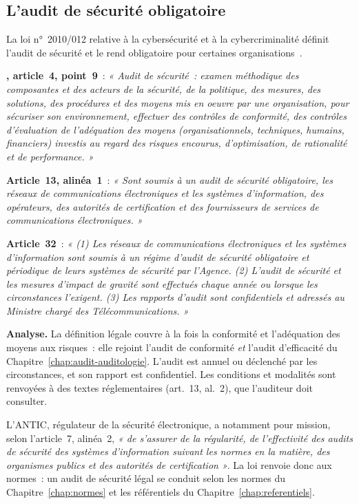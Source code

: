 \subsection{L'audit de sécurité obligatoire}

La loi n°~2010/012 relative à la cybersécurité et à la cybercriminalité
définit l'audit de sécurité et le rend obligatoire pour certaines
organisations~\cite{loi2010012}.

\begin{boxjuris}
\textbf{, article~4, point~9}~: \textit{« Audit de
sécurité~: examen méthodique des composantes et des acteurs de la sécurité,
de la politique, des mesures, des solutions, des procédures et des moyens
mis en oeuvre par une organisation, pour sécuriser son environnement,
effectuer des contrôles de conformité, des contrôles d'évaluation de
l'adéquation des moyens (organisationnels, techniques, humains,
financiers) investis au regard des risques encourus, d'optimisation, de
rationalité et de performance. »}

\medskip
\textbf{Article~13, alinéa~1}~: \textit{« Sont soumis à un audit de sécurité
obligatoire, les réseaux de communications électroniques et les systèmes
d'information, des opérateurs, des autorités de certification et des
fournisseurs de services de communications électroniques. »}

\medskip
\textbf{Article~32}~: \textit{« (1) Les réseaux de communications
électroniques et les systèmes d'information sont soumis à un régime
d'audit de sécurité obligatoire et périodique de leurs systèmes de
sécurité par l'Agence. (2) L'audit de sécurité et les mesures d'impact de
gravité sont effectués chaque année ou lorsque les circonstances
l'exigent. (3) Les rapports d'audit sont confidentiels et adressés au
Ministre chargé des Télécommunications. »}

\medskip
\textbf{Analyse.} La définition légale couvre à la fois la conformité et
l'adéquation des moyens aux risques~: elle rejoint l'audit de conformité
\emph{et} l'audit d'efficacité du Chapitre~\ref{chap:audit-auditologie}.
L'audit est annuel ou déclenché par les circonstances, et son rapport est
confidentiel. Les conditions et modalités sont renvoyées à des textes
réglementaires (art.~13, al.~2), que l'auditeur doit consulter.
\end{boxjuris}

L'ANTIC, régulateur de la sécurité électronique, a notamment pour mission,
selon l'article~7, alinéa~2, \textit{« de s'assurer de la régularité, de
l'effectivité des audits de sécurité des systèmes d'information suivant
les normes en la matière, des organismes publics et des autorités de
certification »}. La loi renvoie donc aux normes~: un audit de sécurité
légal se conduit selon les normes du Chapitre~\ref{chap:normes} et les
référentiels du Chapitre~\ref{chap:referentiels}.

